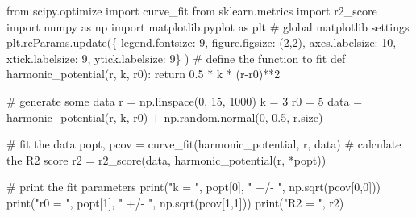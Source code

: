 \documentclass[
  letterpaper,
  DIV=11,
  numbers=noendperiod]{scrreprt}
\newenvironment{Shaded}{\begin{snugshade}}{\end{snugshade}}
\newcommand{\BuiltInTok}[1]{\textcolor[rgb]{0.00,0.23,0.31}{#1}}
\newcommand{\CommentTok}[1]{\textcolor[rgb]{0.37,0.37,0.37}{#1}}
\newcommand{\ControlFlowTok}[1]{\textcolor[rgb]{0.00,0.23,0.31}{#1}}
\newcommand{\DecValTok}[1]{\textcolor[rgb]{0.68,0.00,0.00}{#1}}
\newcommand{\FloatTok}[1]{\textcolor[rgb]{0.68,0.00,0.00}{#1}}
\newcommand{\ImportTok}[1]{\textcolor[rgb]{0.00,0.46,0.62}{#1}}
\newcommand{\KeywordTok}[1]{\textcolor[rgb]{0.00,0.23,0.31}{#1}}
\newcommand{\NormalTok}[1]{\textcolor[rgb]{0.00,0.23,0.31}{#1}}
\newcommand{\OperatorTok}[1]{\textcolor[rgb]{0.37,0.37,0.37}{#1}}
\newcommand{\StringTok}[1]{\textcolor[rgb]{0.13,0.47,0.30}{#1}}
\begin{document}
\begin{Shaded}
\begin{Highlighting}[]
\ImportTok{from}\NormalTok{ scipy.optimize }\ImportTok{import}\NormalTok{ curve\_fit}
\ImportTok{from}\NormalTok{ sklearn.metrics }\ImportTok{import}\NormalTok{ r2\_score}
\ImportTok{import}\NormalTok{ numpy }\ImportTok{as}\NormalTok{ np}
\ImportTok{import}\NormalTok{ matplotlib.pyplot }\ImportTok{as}\NormalTok{ plt}
\CommentTok{\# global matplotlib settings}
\NormalTok{plt.rcParams.update(\{}
    \StringTok{\textquotesingle{}legend.fontsize\textquotesingle{}}\NormalTok{: }\DecValTok{9}\NormalTok{,}
    \StringTok{\textquotesingle{}figure.figsize\textquotesingle{}}\NormalTok{: (}\DecValTok{2}\NormalTok{,}\DecValTok{2}\NormalTok{),}
    \StringTok{\textquotesingle{}axes.labelsize\textquotesingle{}}\NormalTok{: }\DecValTok{10}\NormalTok{,}
    \StringTok{\textquotesingle{}xtick.labelsize\textquotesingle{}}\NormalTok{: }\DecValTok{9}\NormalTok{,}
    \StringTok{\textquotesingle{}ytick.labelsize\textquotesingle{}}\NormalTok{: }\DecValTok{9}\NormalTok{\}}
\NormalTok{)}
\CommentTok{\# define the function to fit}
\KeywordTok{def}\NormalTok{ harmonic\_potential(r, k, r0):}
    \ControlFlowTok{return} \FloatTok{0.5} \OperatorTok{*}\NormalTok{ k }\OperatorTok{*}\NormalTok{ (r}\OperatorTok{{-}}\NormalTok{r0)}\OperatorTok{**}\DecValTok{2}

\CommentTok{\# generate some data}
\NormalTok{r }\OperatorTok{=}\NormalTok{ np.linspace(}\DecValTok{0}\NormalTok{, }\DecValTok{15}\NormalTok{, }\DecValTok{1000}\NormalTok{)}
\NormalTok{k }\OperatorTok{=} \DecValTok{3}
\NormalTok{r0 }\OperatorTok{=} \DecValTok{5}
\NormalTok{data }\OperatorTok{=}\NormalTok{ harmonic\_potential(r, k, r0) }\OperatorTok{+}\NormalTok{ np.random.normal(}\DecValTok{0}\NormalTok{, }\FloatTok{0.5}\NormalTok{, r.size)}

\CommentTok{\# fit the data}
\NormalTok{popt, pcov }\OperatorTok{=}\NormalTok{ curve\_fit(harmonic\_potential, r, data)}
\CommentTok{\# calculate the R2 score}
\NormalTok{r2 }\OperatorTok{=}\NormalTok{ r2\_score(data, harmonic\_potential(r, }\OperatorTok{*}\NormalTok{popt))}

\CommentTok{\# print the fit parameters}
\BuiltInTok{print}\NormalTok{(}\StringTok{"k = "}\NormalTok{, popt[}\DecValTok{0}\NormalTok{], }\StringTok{" +/{-} "}\NormalTok{, np.sqrt(pcov[}\DecValTok{0}\NormalTok{,}\DecValTok{0}\NormalTok{]))}
\BuiltInTok{print}\NormalTok{(}\StringTok{"r0 = "}\NormalTok{, popt[}\DecValTok{1}\NormalTok{], }\StringTok{" +/{-} "}\NormalTok{, np.sqrt(pcov[}\DecValTok{1}\NormalTok{,}\DecValTok{1}\NormalTok{]))}
\BuiltInTok{print}\NormalTok{(}\StringTok{"R2 = "}\NormalTok{, r2)}




\end{Highlighting}
\end{Shaded}
\end{document}

